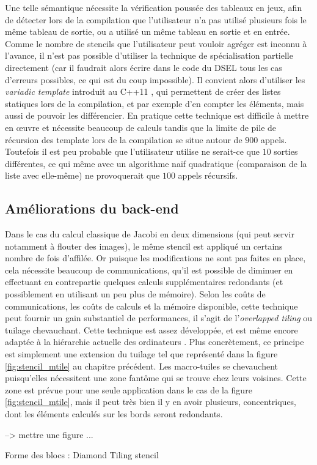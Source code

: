 Une telle sémantique nécessite la vérification poussée des tableaux en jeux, afin de détecter lors de la compilation que l'utilisateur n'a pas utilisé plusieurs fois le même tableau de sortie, ou a utilisé un même tableau en sortie et en entrée. Comme le nombre de stencils que l'utilisateur peut vouloir agréger est inconnu à l'avance, il n'est pas possible d'utiliser la technique de spécialisation partielle directement (car il faudrait alors écrire dans le code du DSEL tous les cas d'erreurs possibles, ce qui est du coup impossible). Il convient alors d'utiliser les \emph{variadic template} introduit au \textsf{C++11} \cite{Art6}, qui permettent de créer des listes statiques lors de la compilation, et par exemple d'en compter les éléments, mais aussi de pouvoir les différencier. En pratique cette technique est difficile à mettre en œuvre et nécessite beaucoup de calculs tandis que la limite de pile de récursion des template lors de la compilation se situe autour de $900$ appels. Toutefois il est peu probable que l'utilisateur utilise ne serait-ce que $10$ sorties différentes, ce qui même avec un algorithme naïf quadratique (comparaison de la liste avec elle-même) ne provoquerait que $100$ appels récursifs.


\subsection{Améliorations du back-end}

Dans le cas du calcul classique de Jacobi en deux dimensions (qui peut servir notamment à flouter des images), le même stencil est appliqué un certains nombre de fois d'affilée. Or puisque les modifications ne sont pas faites en place, cela nécessite beaucoup de communications, qu'il est possible de diminuer en effectuant en contrepartie quelques calculs supplémentaires redondants (et possiblement en utilisant un peu plus de mémoire). Selon les coûts de communications, les coûts de calculs et la mémoire disponible, cette technique peut fournir un gain substantiel de performances, il s'agit de l'\emph{overlapped tiling} ou tuilage chevauchant. Cette technique est assez développée, et est même encore adaptée à la hiérarchie actuelle des ordinateurs \cite{Art17}. Plus concrètement, ce principe est simplement une extension du tuilage tel que représenté dans la figure \ref{fig:stencil_mtile} au chapitre précédent. Les macro-tuiles se chevauchent puisqu'elles nécessitent une zone fantôme qui se trouve chez leurs voisines. Cette zone est prévue pour une seule application dans le cas de la figure \ref{fig:stencil_mtile}, mais il peut très bien il y en avoir plusieurs, concentriques, dont les éléments calculés sur les bords seront redondants. 

--> mettre une figure ...


Forme des blocs : Diamond Tiling stencil \cite{Art16}


